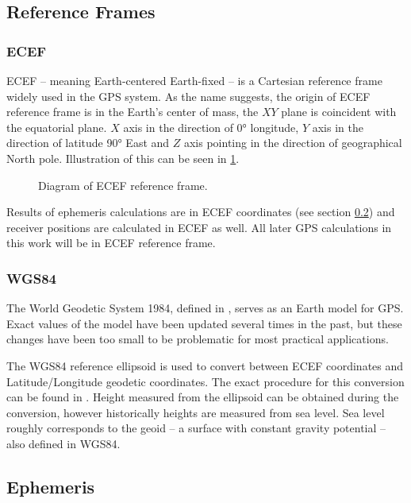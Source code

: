 \subsection{Reference Frames}
\label{sec:ref-frames}

\subsubsection{ECEF}
ECEF -- meaning Earth-centered Earth-fixed -- is a Cartesian reference frame widely used in the GPS system.
As the name suggests, the origin of ECEF reference frame is in the Earth's center of mass, the \(XY\) plane is coincident
with the equatorial plane.
\(X\) axis in the direction of \ang{0} longitude, \(Y\) axis in the direction of latitude
\ang{90} East and \(Z\) axis pointing in
the direction of geographical North pole.
Illustration of this can be seen in \cref{fig:ecef}.

\begin{figure}[h]
	\centering
	
	\caption{Diagram of ECEF reference frame.}
	\label{fig:ecef}
\end{figure}

Results of ephemeris calculations are in ECEF coordinates
(see section \ref{sec:gps-ephemeris}) and receiver positions are calculated
in ECEF as well.
All later GPS calculations in this work will be in ECEF reference frame.

\subsubsection{WGS84}
The World Geodetic System 1984, defined in \cite{nima04},
serves as an Earth model for GPS.
Exact values of the model have been updated several times in the past,
but these changes have been too small to be problematic for most practical
applications.

The WGS84 reference ellipsoid is used to convert between ECEF coordinates and
Latitude/Longitude geodetic coordinates.
The exact procedure for this conversion can be found in \cite{nima04}.
Height measured from the ellipsoid can be obtained during the conversion,
however historically heights are measured from sea level.
Sea level roughly corresponds to the geoid -- a surface with constant gravity
potential -- also defined in WGS84.



\subsection{Ephemeris}
\label{sec:gps-ephemeris}

